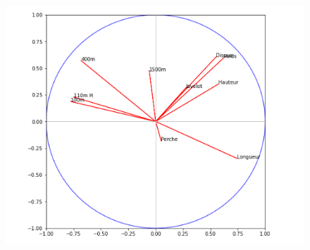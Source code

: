 \documentclass{article}
\begin{document}
\begin{figure}[h!]
\includegraphics[width=\linewidth]{images/cercle_cor.png}
\end{figure}
\end{document}
